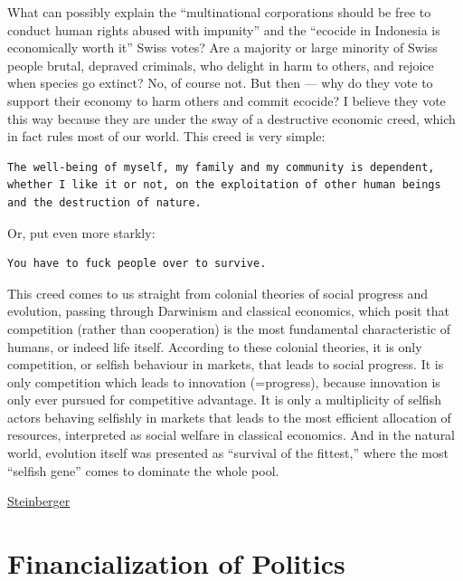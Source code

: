 \documentclass[
]{book}
\begin{document}
What can possibly explain the ``multinational corporations should be free to conduct human rights abused with impunity'' and the ``ecocide in Indonesia is economically worth it'' Swiss votes? Are a majority or large minority of Swiss people brutal, depraved criminals, who delight in harm to others, and rejoice when species go extinct? No, of course not. But then --- why do they vote to support their economy to harm others and commit ecocide? I believe they vote this way because they are under the sway of a destructive economic creed, which in fact rules most of our world. This creed is very simple:

\begin{verbatim}
The well-being of myself, my family and my community is dependent, whether I like it or not, on the exploitation of other human beings and the destruction of nature.
\end{verbatim}

Or, put even more starkly:

\begin{verbatim}
You have to fuck people over to survive.
\end{verbatim}

This creed comes to us straight from colonial theories of social progress and evolution, passing through Darwinism and classical economics, which posit that competition (rather than cooperation) is the most fundamental characteristic of humans, or indeed life itself. According to these colonial theories, it is only competition, or selfish behaviour in markets, that leads to social progress. It is only competition which leads to innovation (=progress), because innovation is only ever pursued for competitive advantage. It is only a multiplicity of selfish actors behaving selfishly in markets that leads to the most efficient allocation of resources, interpreted as social welfare in classical economics. And in the natural world, evolution itself was presented as ``survival of the fittest,'' where the most ``selfish gene'' comes to dominate the whole pool.

\href{https://jksteinberger.medium.com/the-bear-the-tiger-and-the-trade-unionist-4b25df5fb3a9}{Steinberger}

\hypertarget{financialization-of-politics}{%
\section{Financialization of Politics}\label{financialization-of-politics}}
\end{document}
